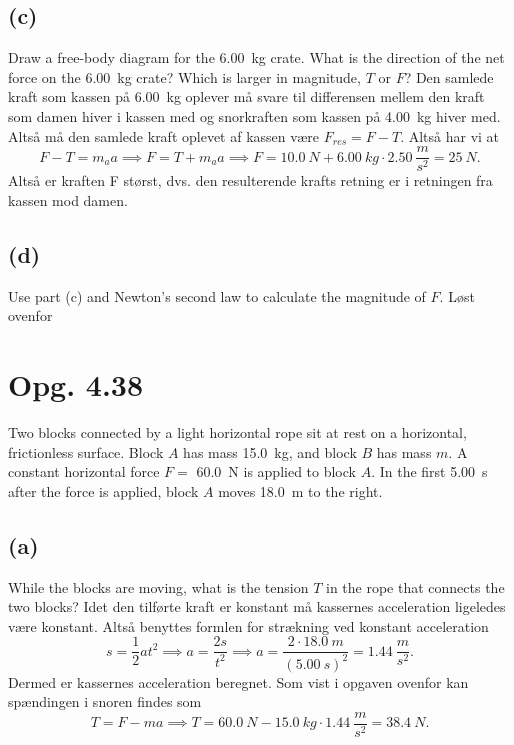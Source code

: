 \documentclass[12pt]{article}
\begin{document}
\subsection*{(c)}
Draw a free-body diagram for the \qty{6,00}{kg} crate. What is the direction of the net force on the \qty{6,00}{kg} crate? Which is larger in magnitude, $T$ or $F$?
\bigbreak
Den samlede kraft som kassen på \qty{6,00}{kg} oplever må svare til differensen mellem den kraft som damen hiver i kassen med og snorkraften som kassen på \qty{4,00}{kg} hiver med. Altså må den samlede kraft oplevet af kassen være $F_{res} = F-T$. Altså har vi at
\[
F-T = m_a a \implies F = T+m_a a \implies F = \qty{10,0}{N} + \qty{6,00}{kg}\cdot \qty{2,50}{\frac{m}{s^2}} = \qty{25}{N}
.\] 
Altså er kraften F størst, dvs. den resulterende krafts retning er i retningen fra kassen mod damen.


\subsection*{(d)}
Use part (c) and Newton’s second law to calculate the magnitude of $F$.
\bigbreak
Løst ovenfor

\section*{Opg. 4.38}
Two blocks connected by a light horizontal rope sit at rest on a horizontal, frictionless surface. Block $A$ has mass \qty{15,0}{kg}, and
block $B$ has mass $m$. A constant horizontal force $F =$ \qty{60,0}{N} is applied to block $A$. In the first \qty{5,00}{s} after the force is applied, block $A$ moves \qty{18,0}{m} to the right.

\subsection*{(a)}
While the blocks are moving, what is the tension $T$ in the rope that connects the two blocks?
\bigbreak
Idet den tilførte kraft er konstant må kassernes acceleration ligeledes være konstant. Altså benyttes formlen for strækning ved konstant acceleration
\[
s = \frac{1}{2}at^2 \implies a = \frac{2s}{t^2} \implies a = \frac{2\cdot \qty{18,0}{m}}{\left( \qty{5,00}{s} \right)^2} = \qty{1,44}{\frac{m}{s^2}}
.\] 
Dermed er kassernes acceleration beregnet. Som vist i opgaven ovenfor kan spændingen i snoren findes som
\[
T = F-ma \implies T = \qty{60,0}{N} - \qty{15,0}{kg} \cdot \qty{1,44}{\frac{m}{s^2}} = \qty{38,4}{N}
.\] 
\end{document}
